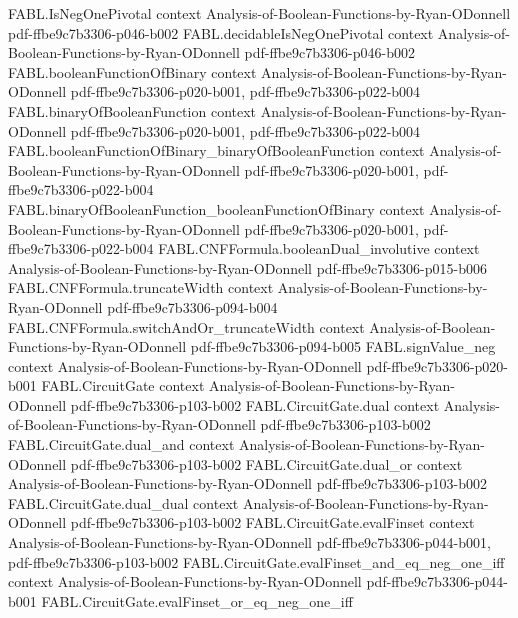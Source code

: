 \begin{theorem}
\proofstep
  {FABL.IsNegOnePivotal}
  {context}
  {Analysis-of-Boolean-Functions-by-Ryan-ODonnell}
  {pdf-ffbe9c7b3306-p046-b002}
\proofstep
  {FABL.decidableIsNegOnePivotal}
  {context}
  {Analysis-of-Boolean-Functions-by-Ryan-ODonnell}
  {pdf-ffbe9c7b3306-p046-b002}
\proofstep
  {FABL.booleanFunctionOfBinary}
  {context}
  {Analysis-of-Boolean-Functions-by-Ryan-ODonnell}
  {pdf-ffbe9c7b3306-p020-b001,
    pdf-ffbe9c7b3306-p022-b004}
\proofstep
  {FABL.binaryOfBooleanFunction}
  {context}
  {Analysis-of-Boolean-Functions-by-Ryan-ODonnell}
  {pdf-ffbe9c7b3306-p020-b001,
    pdf-ffbe9c7b3306-p022-b004}
\proofstep
  {FABL.booleanFunctionOfBinary_binaryOfBooleanFunction}
  {context}
  {Analysis-of-Boolean-Functions-by-Ryan-ODonnell}
  {pdf-ffbe9c7b3306-p020-b001,
    pdf-ffbe9c7b3306-p022-b004}
\proofstep
  {FABL.binaryOfBooleanFunction_booleanFunctionOfBinary}
  {context}
  {Analysis-of-Boolean-Functions-by-Ryan-ODonnell}
  {pdf-ffbe9c7b3306-p020-b001,
    pdf-ffbe9c7b3306-p022-b004}
\proofstep
  {FABL.CNFFormula.booleanDual_involutive}
  {context}
  {Analysis-of-Boolean-Functions-by-Ryan-ODonnell}
  {pdf-ffbe9c7b3306-p015-b006}
\proofstep
  {FABL.CNFFormula.truncateWidth}
  {context}
  {Analysis-of-Boolean-Functions-by-Ryan-ODonnell}
  {pdf-ffbe9c7b3306-p094-b004}
\proofstep
  {FABL.CNFFormula.switchAndOr_truncateWidth}
  {context}
  {Analysis-of-Boolean-Functions-by-Ryan-ODonnell}
  {pdf-ffbe9c7b3306-p094-b005}
\proofstep
  {FABL.signValue_neg}
  {context}
  {Analysis-of-Boolean-Functions-by-Ryan-ODonnell}
  {pdf-ffbe9c7b3306-p020-b001}
\proofstep
  {FABL.CircuitGate}
  {context}
  {Analysis-of-Boolean-Functions-by-Ryan-ODonnell}
  {pdf-ffbe9c7b3306-p103-b002}
\proofstep
  {FABL.CircuitGate.dual}
  {context}
  {Analysis-of-Boolean-Functions-by-Ryan-ODonnell}
  {pdf-ffbe9c7b3306-p103-b002}
\proofstep
  {FABL.CircuitGate.dual_and}
  {context}
  {Analysis-of-Boolean-Functions-by-Ryan-ODonnell}
  {pdf-ffbe9c7b3306-p103-b002}
\proofstep
  {FABL.CircuitGate.dual_or}
  {context}
  {Analysis-of-Boolean-Functions-by-Ryan-ODonnell}
  {pdf-ffbe9c7b3306-p103-b002}
\proofstep
  {FABL.CircuitGate.dual_dual}
  {context}
  {Analysis-of-Boolean-Functions-by-Ryan-ODonnell}
  {pdf-ffbe9c7b3306-p103-b002}
\proofstep
  {FABL.CircuitGate.evalFinset}
  {context}
  {Analysis-of-Boolean-Functions-by-Ryan-ODonnell}
  {pdf-ffbe9c7b3306-p044-b001,
    pdf-ffbe9c7b3306-p103-b002}
\proofstep
  {FABL.CircuitGate.evalFinset_and_eq_neg_one_iff}
  {context}
  {Analysis-of-Boolean-Functions-by-Ryan-ODonnell}
  {pdf-ffbe9c7b3306-p044-b001}
\proofstep
  {FABL.CircuitGate.evalFinset_or_eq_neg_one_iff}

\end{theorem}
